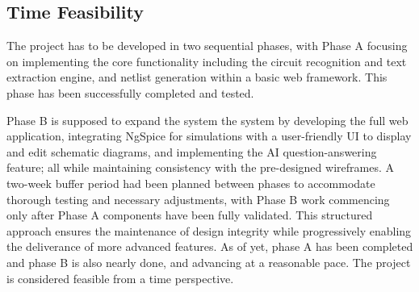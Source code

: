 \subsection{Time Feasibility}

The project has to be developed in two sequential phases, with Phase A focusing on implementing the core functionality including the circuit recognition and text extraction engine, and netlist generation within a basic web framework. This phase has been successfully completed and tested.

Phase B is supposed to expand the system the system by developing the full web application, integrating NgSpice for simulations with a user-friendly UI to display and edit schematic diagrams, and implementing the AI question-answering feature; all while maintaining consistency with the pre-designed wireframes. A two-week buffer period had been planned between phases to accommodate thorough testing and necessary adjustments, with Phase B work commencing only after Phase A components have been fully validated. This structured approach ensures the maintenance of design integrity while progressively enabling the deliverance of more advanced features. As of yet, phase A has been completed and phase B is also nearly done, and advancing at a reasonable pace. The project is considered feasible from a time perspective.
